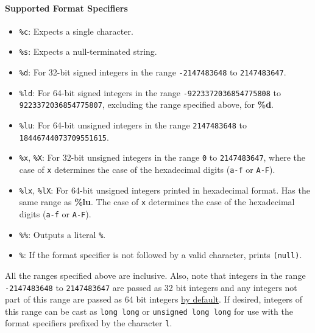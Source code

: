 \paragraph{Supported Format Specifiers}
\begin{itemize}
  \item \texttt{\%c}: Expects a single character.
  \item \texttt{\%s}: Expects a null-terminated string.
  \item \texttt{\%d}: For 32-bit signed integers in the range \texttt{-2147483648} to \texttt{2147483647}.
  \item \texttt{\%ld}: For 64-bit signed integers in the range \texttt{-9223372036854775808} to \texttt{9223372036854775807}, excluding the range specified above, for \textbf{\%d}.
  \item \texttt{\%lu}: For 64-bit unsigned integers in the range \texttt{2147483648} to \texttt{18446744073709551615}.
  \item \texttt{\%x}, \texttt{\%X}: For 32-bit unsigned integers in the range \texttt{0} to \texttt{2147483647}, where the case of \texttt{x} determines the case of the hexadecimal digits (\texttt{a-f} or \texttt{A-F}).
  \item \texttt{\%lx}, \texttt{\%lX}: For 64-bit unsigned integers printed in hexadecimal format. Has the same range as \textbf{\%lu}. The case of \texttt{x} determines the case of the hexadecimal digits (\texttt{a-f} or \texttt{A-F}).
  \item \texttt{\%\%}: Outputs a literal \texttt{\%}.
  \item \texttt{\%}: If the format specifier is not followed by a valid character, prints \texttt{(null)}.
\end{itemize}

\begin{flushleft}
All the ranges specified above are inclusive. Also, note that integers in the 
range \texttt{-2147483648} to \texttt{2147483647} are passed as 32 bit integers 
and any integers not part of this range are passed as 64 bit integers \underline{by default}.
If desired, integers of this range can be cast as \texttt{long long} or \texttt{unsigned long long} 
for use with the format specifiers prefixed by the character \texttt{l}.
\end{flushleft}

